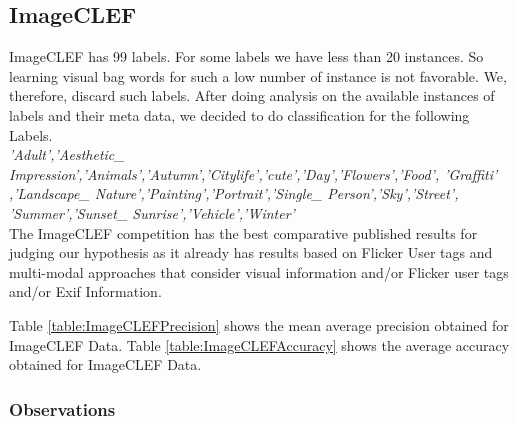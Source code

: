 \subsection{ImageCLEF}

ImageCLEF has 99 labels. For some labels we have less than 20 instances. So learning visual bag words for such a low number of instance is not favorable. We, therefore, discard such labels. After doing analysis on the available instances of labels and their meta data, we decided to do classification for the following Labels. \\
\textit{'Adult','Aesthetic\_ Impression','Animals','Autumn','Citylife','cute','Day','Flowers','Food',
'Graffiti' ,'Landscape\_ Nature','Painting','Portrait','Single\_ Person','Sky','Street',
'Summer','Sunset\_ Sunrise','Vehicle','Winter'} \\

The ImageCLEF competition \cite{CLEF} has the best comparative published results for judging our hypothesis as it already has results based on Flicker User tags and multi-modal approaches that consider visual information and/or Flicker user tags and/or Exif Information.

Table \ref{table:ImageCLEFPrecision} shows the mean average precision obtained for ImageCLEF Data. 
Table  \ref{table:ImageCLEFAccuracy} shows the average accuracy obtained for ImageCLEF Data. 
 
\subsubsection*{Observations}

